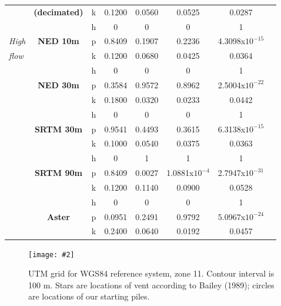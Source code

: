 \documentclass[12pt,letterpaper]{article}
\newcommand{\Pic}[2][0.85]{\begin{center}\texttt{[image: \#2]}
 \end{center} }
\begin{document}
\begin{longtable}{p{1.3cm}ccccccc}
   & \textbf{(decimated)}&k & 0.1200 & 0.0560 &0.0525 & 0.0287 \\
   \cline{2-7}
  &\multirow{3}{*}{\textbf{NED 10m}}& h &0  & 0 & 0 &1 \\
   \textit{High}& &p & 0.8409 & 0.1907 & 0.2236 &4.3098x$10^{-15}$ \\
    \textit{flow}&&k & 0.1200 & 0.0680 &0.0425 & 0.0364 \\
   \cline{2-7}
  &\multirow{3}{*}{\textbf{NED 30m}}& h &0  & 0 & 0 &1 \\
   & &p & 0.3584 & 0.9572 & 0.8962 &2.5004x$10^{-22}$ \\
   & &k & 0.1800 & 0.0320 &0.0233 & 0.0442 \\
   \cline{2-7}
 &\multirow{3}{*}{\textbf{SRTM 30m}}& h &0  & 0 & 0 &1 \\
   & &p & 0.9541 & 0.4493 & 0.3615 &6.3138x$10^{-15}$ \\
   & &k & 0.1000 & 0.0540 &0.0375 & 0.0363 \\
   \cline{2-7}
    &\multirow{3}{*}{\textbf{SRTM 90m}}&h & 0 &1 & 1 &1 \\
    &&p & 0.8409& 0.0027 & 1.0881x$10^{-4}$ &2.7947x$10^{-31}$\\
    &&k & 0.1200 & 0.1140 & 0.0900 &0.0528 \\ 
   \cline{2-7}
&  \multirow{3}{*}{\textbf{Aster}}& h &0  & 0 & 0 &1 \\
 &   &p & 0.0951 & 0.2491 & 0.9792 &5.0967x$10^{-24}$ \\
  &  &k & 0.2400 & 0.0640 &0.0192 & 0.0457 \\
 \end{longtable}





\begin{figure}[H]

  \Pic[0.9]{mammothmap.pdf}

  \caption{UTM grid for WGS84 reference system, zone 11. Contour interval is 100 m.  Stars are locations of vent
    according to Bailey (1989); circles are locations of our starting
    piles. }
  \label{fig1}
\end{figure}
\end{document}

